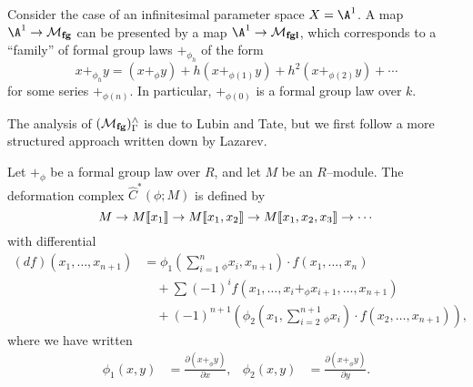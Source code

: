 \begin{example}
Consider the case of an infinitesimal parameter space $X = \A^1$.  A map $\A^1 \to \moduli{fg}$ can be presented by a map $\A^1 \to \moduli{fgl}$, which corresponds to a ``family'' of formal group laws $+_{\phi_h}$ of the form \[x +_{\phi_h} y = (x +_\phi y) + h(x +_{\phi(1)} y) + h^2(x +_{\phi(2)} y) + \cdots\] for some series $+_{\phi(n)}$.  In particular, $+_{\phi(0)}$ is a formal group law over $k$.
\end{example}

The analysis of $(\mathcal{M}_{\mathbf{fg}})^\wedge_\Gamma$ is due to Lubin and Tate, but we first follow a more structured approach written down by Lazarev.
\begin{definition}
Let $+_\phi$ be a formal group law over $R$, and let $M$ be an $R$--module. The deformation complex $\widehat C^*(\phi; M)$ is defined by \[M \to M\llbracket{x_1}\rrbracket \to M\llbracket{x_1, x_2}\rrbracket \to M\llbracket{x_1, x_2, x_3}\rrbracket \to \cdots\] with differential
\begin{align*}
(df)(x_1, \ldots, x_{n+1}) & = \phi_1\left(\sum_{i=1}^n {}_\phi x_i, x_{n+1} \right) \cdot f(x_1, \ldots, x_n) \\
& \quad + \sum (-1)^i f(x_1, \ldots, x_i +_\phi x_{i+1}, \ldots, x_{n+1}) \\
& \quad + (-1)^{n+1} \left( \phi_2\left(x_1, \sum_{i=2}^{n+1} {}_\phi x_i \right) \cdot f(x_2, \ldots, x_{n+1}) \right),
\end{align*}
where we have written
\begin{align*}
\phi_1(x, y) & = \frac{\partial(x +_\phi y)}{\partial x}, &
\phi_2(x, y) & = \frac{\partial(x +_\phi y)}{\partial y}.
\end{align*}
\end{definition}

